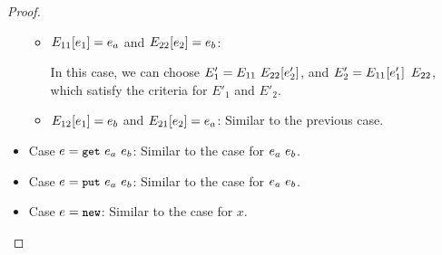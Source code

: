 \begin{proof}
\begin{itemize}
\begin{itemize}
        \item $E_{11}\hspace{-0.5mm}\left[e_1\right] = e_a$ and
          $E_{22}\hspace{-0.5mm}\left[e_2\right] = e_b$:

          In this case, we can choose $E'_1 =
          E_{11}~E_{22}\hspace{-0.5mm}\left[e'_2\right]$, and $E'_2 =
          E_{11}\hspace{-0.5mm}\left[e'_1\right]~E_{22}$, which satisfy the
          criteria for $E'_1$ and $E'_2$.


        \item $E_{12}\hspace{-0.5mm}\left[e_1\right] = e_b$ and
          $E_{21}\hspace{-0.5mm}\left[e_2\right] = e_a$: Similar to the previous
          case.
      \end{itemize}

    \item Case $e = \mbox{\small{\texttt{get}}}~e_a~e_b$: Similar to the case for $e_a~e_b$.

    \item Case $e = \mbox{\small{\texttt{put}}}~e_a~e_b$: Similar to the case for $e_a~e_b$.

    \item Case $e = \mbox{\small{\texttt{new}}}$: Similar to the case for $x$.
  \end{itemize}
\end{proof}
